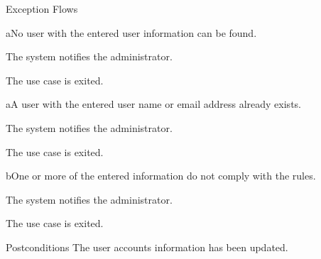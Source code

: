 %
\begin{cpartList}{Exception Flows}
  \begin{innerList}{4}{a}{No user with the entered user information can be found.}
    \item The system notifies the administrator.
    \item The use case is exited.
  \end{innerList}

  \begin{innerList}{7}{a}{A user with the entered user name or email address already exists.}
    \item The system notifies the administrator.
    \item The use case is exited.
  \end{innerList}

  \begin{innerList}{7}{b}{One or more of the entered information do not comply with the rules.}
    \item The system notifies the administrator.
    \item The use case is exited.
  \end{innerList}
\end{cpartList}

%
\begin{cpart}{Postconditions}
The user accounts information has been updated.
\end{cpart}

\clearpage

